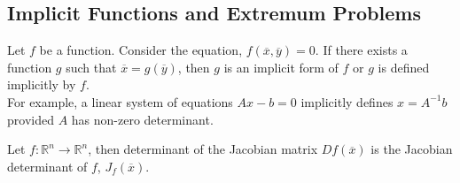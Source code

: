 \subsection{Implicit Functions and Extremum Problems}
\begin{definition}
	Let $f$ be a function. Consider the equation, $f(\overline{x},\overline{y}) = 0$. If there exists a function $g$ such that $\overline{x} = g(\overline{y})$, then $g$ is an implicit form of $f$ or $g$ is defined implicitly by $f$.\\

	For example, a linear system of equations $Ax-b = 0$ implicitly defines $x = A^{-1}b$ provided $ A$ has non-zero determinant.
\end{definition}

\begin{definition}
	Let $f : \mathbb{R}^n \to \mathbb{R}^n$, then determinant of the Jacobian matrix $Df(\overline{x})$ is the Jacobian determinant of $f$, $J_f(\overline{x})$.
\end{definition}

